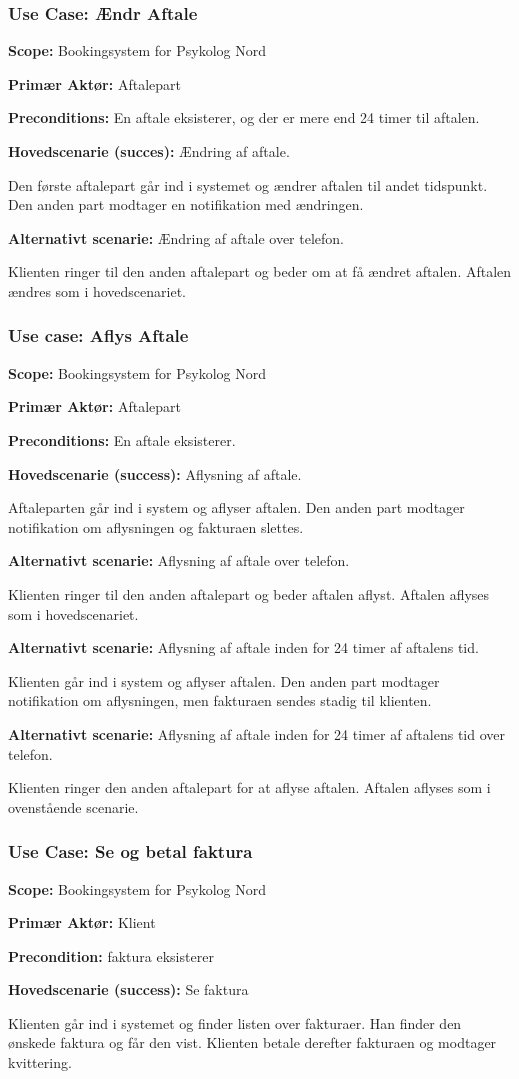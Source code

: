 \subsubsection{Use Case: Ændr Aftale}
{\setlength{\parindent}{0cm}
\textbf{Scope:} Bookingsystem for Psykolog Nord

\textbf{Primær Aktør:} Aftalepart 

\textbf{Preconditions:} En aftale eksisterer, og der er mere end 24 timer til aftalen.

\textbf{Hovedscenarie (succes):} Ændring af aftale.

Den første aftalepart går ind i systemet og ændrer aftalen til andet tidspunkt.
Den anden part modtager en notifikation med ændringen.

\textbf{Alternativt scenarie:} Ændring af aftale over telefon.

Klienten ringer til den anden aftalepart og beder om at få ændret aftalen. Aftalen ændres som i hovedscenariet.
}

\subsubsection{Use case: Aflys Aftale}
{\setlength{\parindent}{0cm}
\textbf{Scope:} Bookingsystem for Psykolog Nord

\textbf{Primær Aktør:} Aftalepart

\textbf{Preconditions:} En aftale eksisterer.

\textbf{Hovedscenarie (success):} Aflysning af aftale.

Aftaleparten går ind i system og aflyser aftalen.
Den anden part modtager notifikation om aflysningen og fakturaen slettes.

\textbf{Alternativt scenarie:} Aflysning af aftale over telefon.

Klienten ringer til den anden aftalepart og beder aftalen aflyst.
Aftalen aflyses som i hovedscenariet.

\textbf{Alternativt scenarie:} Aflysning af aftale inden for 24 timer af aftalens tid.

Klienten går ind i system og aflyser aftalen.
Den anden part modtager notifikation om aflysningen, men fakturaen sendes stadig til klienten.

\textbf{Alternativt scenarie:} Aflysning af aftale inden for 24 timer af aftalens tid over telefon.

Klienten ringer den anden aftalepart for at aflyse aftalen. Aftalen aflyses som i ovenstående scenarie.
}

\subsubsection{Use Case: Se og betal faktura}
{\setlength{\parindent}{0cm}
\textbf{Scope:} Bookingsystem for Psykolog Nord

\textbf{Primær Aktør:} Klient

\textbf{Precondition: }faktura eksisterer

\textbf{Hovedscenarie (success):} Se faktura

Klienten går ind i systemet og finder listen over fakturaer. 
Han finder den ønskede faktura og får den vist. Klienten betale derefter fakturaen og modtager kvittering.
}
